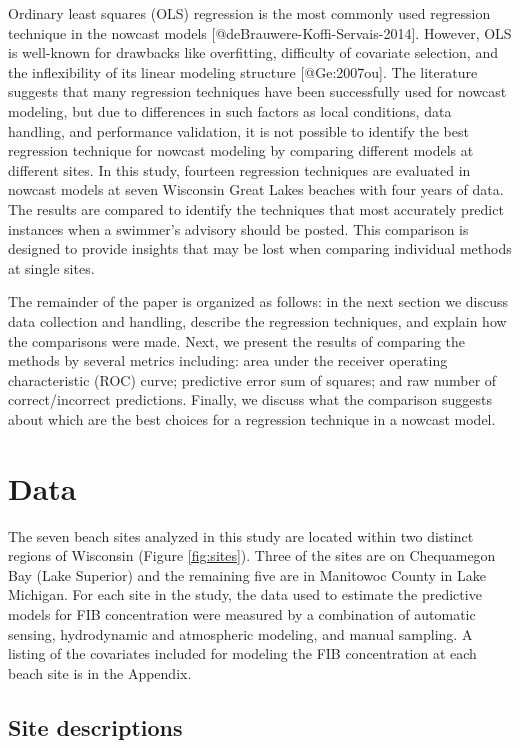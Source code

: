 Ordinary least squares (OLS) regression is the most commonly used
regression technique in the nowcast models
{[}@deBrauwere-Koffi-Servais-2014{]}. However, OLS is well-known for
drawbacks like overfitting, difficulty of covariate selection, and the
inflexibility of its linear modeling structure {[}@Ge:2007ou{]}. The
literature suggests that many regression techniques have been
successfully used for nowcast modeling, but due to differences in such
factors as local conditions, data handling, and performance validation,
it is not possible to identify the best regression technique for nowcast
modeling by comparing different models at different sites. In this
study, fourteen regression techniques are evaluated in nowcast models at
seven Wisconsin Great Lakes beaches with four years of data. The results
are compared to identify the techniques that most accurately predict
instances when a swimmer's advisory should be posted. This comparison is
designed to provide insights that may be lost when comparing individual
methods at single sites.

The remainder of the paper is organized as follows: in the next section
we discuss data collection and handling, describe the regression
techniques, and explain how the comparisons were made. Next, we present
the results of comparing the methods by several metrics including: area
under the receiver operating characteristic (ROC) curve; predictive
error sum of squares; and raw number of correct/incorrect predictions.
Finally, we discuss what the comparison suggests about which are the
best choices for a regression technique in a nowcast model.

\section{Data}\label{data}

The seven beach sites analyzed in this study are located within two
distinct regions of Wisconsin (Figure \ref{fig:sites}). Three of the
sites are on Chequamegon Bay (Lake Superior) and the remaining five are
in Manitowoc County in Lake Michigan. For each site in the study, the
data used to estimate the predictive models for FIB concentration were
measured by a combination of automatic sensing, hydrodynamic and
atmospheric modeling, and manual sampling. A listing of the covariates
included for modeling the FIB concentration at each beach site is in the
Appendix.

\subsection{Site descriptions}\label{site-descriptions}

